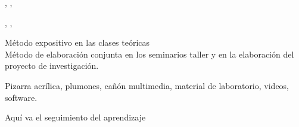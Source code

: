 \documentclass[a4paper,8pt]{article}
\begin{document}
\begin{contenidos}
\cite{Soars022S}, \cite{Cambridge06}, \cite{MacGrew99} 



\cite{Soars022S}, \cite{Cambridge06}, \cite{MacGrew99} 





\end{contenidos}




\begin{estrategiasEnsenanza}
    \begin{metodos}
        Método expositivo en las clases teóricas \\
        Método de elaboración conjunta en los seminarios taller y en la elaboración del proyecto de investigación.
    \end{metodos}
    \begin{medios}
        Pizarra acrílica, plumones, cañón multimedia, material de laboratorio, videos, software.
    \end{medios}
    \begin{formasOrganizacion}
    \end{formasOrganizacion}
    \begin{programacion}
    \end{programacion}
    \begin{segumientoAprendizaje}
        Aquí va el seguimiento del aprendizaje
    \end{segumientoAprendizaje}
\end{estrategiasEnsenanza}
\end{document}
